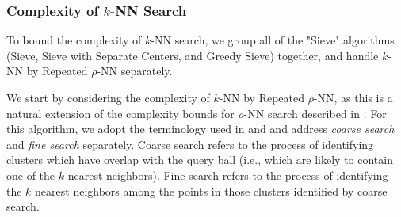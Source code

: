 \subsubsection{Complexity of $k$-NN Search}
\label{paragraph:methods:knn-complexity}

To bound the complexity of $k$-NN search, we group all of the "Sieve" algorithms (Sieve, 
Sieve with Separate Centers, and Greedy Sieve) together, and handle $k$-NN by Repeated $\rho$-NN separately.

We start by considering the complexity of $k$-NN by Repeated $\rho$-NN, as this  
is a natural extension of the complexity bounds for $\rho$-NN search described in 
\cite{ishaq2019clustered}. For this algorithm, we adopt the terminology used in 
\cite{ishaq2019clustered} and \cite{yu2015entropy} and address \emph{coarse search} and \emph{fine search} separately. 
Coarse search refers to the process of identifying clusters
which have overlap with the query ball (i.e., which are likely to contain one of the $k$ nearest neighbors). 
Fine search refers to the process
of identifying the $k$ nearest neighbors among the points in those clusters identified by coarse search.








